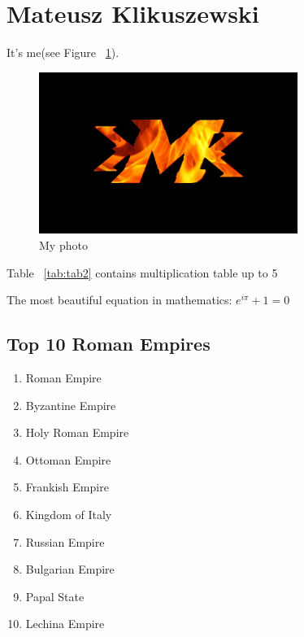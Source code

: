 \section{Mateusz Klikuszewski}
\label{sec:matklik}

It's me(see Figure ~\ref{fig:mk}).

\begin{figure}[htbp]
    \centering
    \includegraphics[width=0.75\textwidth]{pictures/mk.jpg}
    \caption{My photo}
    \label{fig:mk}
\end{figure}

Table ~\ref{tab:tab2} contains multiplication table up to 5



The most beautiful equation in mathematics:
\begin{math}e^{i\pi} + 1 = 0\end{math}

\subsection{Top 10 Roman Empires}

\begin{enumerate}
    \item Roman Empire
    \item Byzantine Empire
    \item Holy Roman Empire
    \item Ottoman Empire
    \item Frankish Empire
    \item Kingdom of Italy
    \item Russian Empire
    \item Bulgarian Empire
    \item Papal State
    \item Lechina Empire
\end{enumerate}


